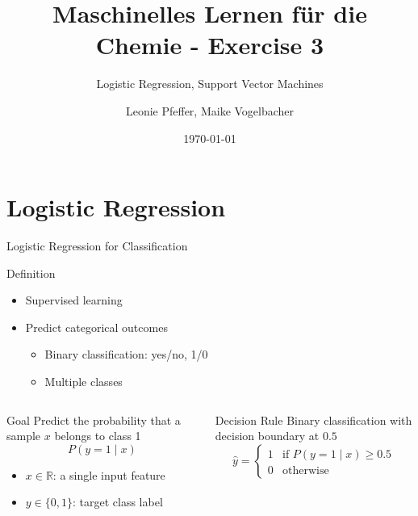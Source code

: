 \documentclass[
                en,
                ]{sdqbeamer}
\title[Ex. 3: Classification]{Maschinelles Lernen für die Chemie - Exercise 3}
\subtitle{Logistic Regression, Support Vector Machines}
\author[L. Pfeffer, M. Vogelbacher]{Leonie Pfeffer, Maike Vogelbacher}
\date[\today]{\today}
\begin{document}
\begin{frame}[title blue vertical, picture=images/iris.jpg]
	\titlepage
\end{frame}

\section{Logistic Regression}

\begin{frame}{Logistic Regression for Classification}
    \begin{greenblock}{Definition}
        \begin{itemize}
            \item Supervised learning
            \item Predict categorical outcomes
                \begin{itemize}
                    \item Binary classification: yes/no, 1/0
                    \item Multiple classes
                \end{itemize}
        \end{itemize}
    \end{greenblock}
    \begin{columns}
        \column{\kitthreecolumns}
        \begin{greenblock}{Goal}
            Predict the probability that a sample $x$ belongs to class 1
            \begin{equation*}
                P(y = 1 \mid x)
            \end{equation*}
            \begin{itemize}
                \item $x \in \mathbb{R}$: a single input feature
                \item $y \in \{0, 1\}$: target class label
            \end{itemize}
        \end{greenblock}

        \column{\kitthreecolumns}
        \begin{greenblock}{Decision Rule}
            Binary classification with decision boundary at $0.5$
            \begin{equation*}
                \hat{y} =
                \begin{cases}
                1 & \text{if } P(y = 1 \mid x) \geq 0.5 \\
                0 & \text{otherwise}
                \end{cases}
            \end{equation*}
        \end{greenblock}
    \end{columns}
\end{frame}
\end{document}

